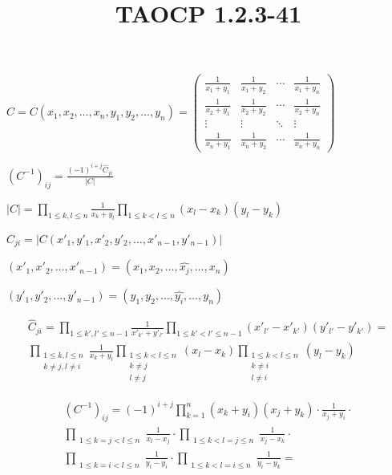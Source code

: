 \documentclass{article}
\title{TAOCP 1.2.3\mbox{-}41}
\begin{document}
\maketitle

\( C=C(x_{1},x_{2},\ldots,x_{n},y_{1},y_{2},\ldots,y_{n}) = \left(\begin{matrix} \frac{1}{x_{1}+y_{1}} & \frac{1}{x_{1}+y_{2}} & \cdots & \frac{1}{x_{1}+y_{n}} \\ \frac{1}{x_{2}+y_{1}} & \frac{1}{x_{2}+y_{2}} & \cdots & \frac{1}{x_{2}+y_{n}} \\ \vdots & \vdots & \ddots & \vdots \\ \frac{1}{x_{n}+y_{1}} & \frac{1}{x_{n}+y_{2}} & \cdots & \frac{1}{x_{n}+y_{n}} \end{matrix}\right) \)

\( {(C^{-1})}_{ij} = \frac{{(-1)}^{i+j}\hat{C}_{ji}}{|C|} \)

\( |C| = \prod_{1 \leq k,l \leq n}\frac{1}{x_{k}+y_{l}} \prod_{1 \leq k < l \leq n} (x_{l}-x_{k})(y_{l}-y_{k}) \)

\( \hat{C}_{ji} = |C(x'_{1},y'_{1},x'_{2},y'_{2},\ldots,x'_{n-1},y'_{n-1})| \)

\( (x'_{1},x'_{2},\ldots,x'_{n-1}) = (x_{1},x_{2},\ldots,\widehat{x_{j}},\ldots,x_{n}) \)

\( (y'_{1},y'_{2},\ldots,y'_{n-1}) = (y_{1},y_{2},\ldots,\widehat{y_{i}},\ldots,y_{n}) \)

\begin{multline*}
\hat{C}_{ji} = \prod_{1 \leq k',l' \leq n-1}\frac{1}{x'_{k'}+y'_{l'}} \prod_{1 \leq k' < l' \leq n-1} (x'_{l'}-x'_{k'})(y'_{l'}-y'_{k'}) = \\
\prod_{\substack{1 \leq k,l \leq n \\ k \neq j, l \neq i}}\frac{1}{x_{k}+y_{l}} \prod_{\substack{1 \leq k < l \leq n \\ k \neq j \\ l \neq j}} (x_{l}-x_{k}) \prod_{\substack{1 \leq k < l \leq n \\ k \neq i \\ l \neq i}} (y_{l}-y_{k})
\end{multline*}

\begin{multline*}
{(C^{-1})}_{ij} = {(-1)}^{i+j} \prod_{k=1}^{n}(x_{k} + y_{i})(x_{j}+y_{k}) \cdot \frac{1}{x_{j}+y_{i}} \cdot \\
\prod_{\substack{1 \leq k = j < l \leq n}} \frac{1}{x_{l}-x_{j}} \cdot \prod_{\substack{1 \leq k < l = j \leq n}} \frac{1}{x_{j}-x_{k}} \cdot \\
\prod_{\substack{1 \leq k = i < l \leq n}} \frac{1}{y_{l}-y_{i}} \cdot \prod_{\substack{1 \leq k < l = i \leq n}} \frac{1}{y_{i}-y_{k}} =
\end{multline*}
\end{document}
